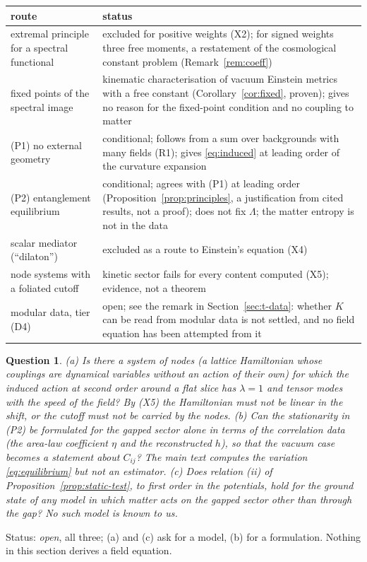 \documentclass[11pt,a4paper]{article}
\theoremstyle{stmt}
\theoremstyle{defn}
\theoremstyle{rmk}
\newtheorem{question}[theorem]{Question}
\numberwithin{equation}{section}
\newcommand{\status}[1]{\par\noindent\textsf{\small Status: #1}\par}
\begin{document}
{\begin{center}\small
\begin{tabular}{p{}p{}}
\hline
route & status\\
\hline
extremal principle for a spectral functional & excluded for positive weights (X2); for signed weights three free moments, a restatement of the cosmological constant problem (Remark~\ref{rem:coeff})\\
fixed points of the spectral image & kinematic characterisation of vacuum Einstein metrics with a free constant (Corollary~\ref{cor:fixed}, proven); gives no reason for the fixed-point condition and no coupling to matter\\
(P1) no external geometry & conditional; follows from a sum over backgrounds with many fields (R1); gives \eqref{eq:induced} at leading order of the curvature expansion\\
(P2) entanglement equilibrium & conditional; agrees with (P1) at leading order (Proposition~\ref{prop:principles}, a justification from cited results, not a proof); does not fix $\Lambda$; the matter entropy is not in the data\\
scalar mediator (``dilaton'') & excluded as a route to Einstein's equation (X4)\\
node systems with a foliated cutoff & kinetic sector fails for every content computed (X5); evidence, not a theorem\\
modular data, tier \textup{(D4)} & open; see the remark in Section~\ref{sec:t-data}: whether $K$ can be read from modular data is not settled, and no field equation has been attempted from it\\
\hline
\end{tabular}
\end{center}

\begin{question}\label{q:b3}
\textup{(a)} Is there a system of nodes (a lattice Hamiltonian whose couplings are dynamical variables without an action of their own) for which the induced action at second order around a flat slice has $\lambda=1$ and tensor modes with the speed of the field? By (X5) the Hamiltonian must not be linear in the shift, or the cutoff must not be carried by the nodes. \textup{(b)} Can the stationarity in (P2) be formulated for the gapped sector alone in terms of the correlation data (the area-law coefficient $\eta$ and the reconstructed $h$), so that the vacuum case becomes a statement about $C_{ij}$? The main text computes the variation \eqref{eq:equilibrium} but not an estimator. \textup{(c)} Does relation \textup{(ii)} of Proposition~\ref{prop:static-test}, to first order in the potentials, hold for the ground state of any model in which matter acts on the gapped sector other than through the gap? No such model is known to us.
\end{question}
\status{\emph{open}, all three; (a) and (c) ask for a model, (b) for a formulation. Nothing in this section derives a field equation.}

}
\end{document}
